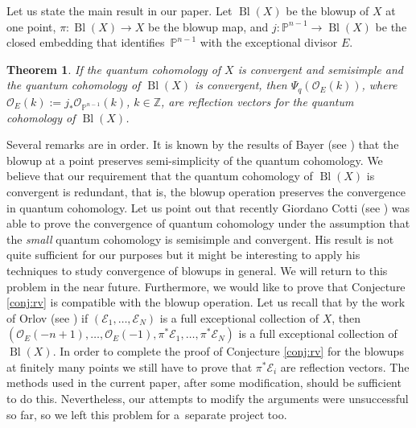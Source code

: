 \documentclass[pdftex]{sigma}
\numberwithin{equation}{section}
\newtheorem{Theorem}{Theorem}[section]
\newcommand{\ZZ}{\mathbb{Z}}
\newcommand{\PP}{\mathbb{P}}
\renewcommand{\O}{\mathcal{O}}
\newcommand{\E}{\mathcal{E}}
\begin{document}
Let us state the main result in our paper. Let $\operatorname{Bl}(X)$
be the blowup of $X$ at one point, $\pi\colon \operatorname{Bl}(X)\to X$ be
the blowup map, and $j\colon \PP^{n-1}\to \operatorname{Bl}(X)$ be the
closed embedding that identifies~$\PP^{n-1}$ with the exceptional
divisor $E$.
\begin{Theorem}\label{thm}
 If the quantum cohomology of $X$ is convergent and semisimple and
 the quantum cohomology of $\operatorname{Bl}(X)$ is convergent, then
 $\Psi_q(\O_E(k))$, where $\O_E(k):= j_* \O_{\PP^{n-1}}(k)$, $k\in \ZZ$, are
 reflection vectors for the quantum cohomology of
 $\operatorname{Bl}(X)$.
\end{Theorem}
Several remarks are in order. It is known by the results of Bayer (see
\cite{Ba}) that the blowup at a point preserves semi-simplicity of the
quantum cohomology. We believe that our requirement that the quantum
cohomology of $\operatorname{Bl}(X)$ is convergent is redundant, that
is, the blowup operation preserves the convergence in quantum
cohomology. Let us point out that recently Giordano Cotti (see
\cite[Theorem 6.6]{Cotti2021})
was able to prove the convergence of quantum cohomology under the
assumption that the {\em small} quantum cohomology is semisimple and
convergent. His result is not quite sufficient for our purposes but
it might be interesting to apply his techniques to study convergence
of blowups in general. We will return to this problem in the near future.
Furthermore, we would like to prove
that Conjecture \ref{conj:rv} is compatible with the blowup
operation. Let us recall that by the work of Orlov (see \cite{Orlov}) if
$(\E_1,\dots,\E_N)$ is a full exceptional collection of $X$, then
$(\O_E(-n+1), \dots, \O_E(-1), \pi^*\E_1,\dots,\pi^*\E_N)$ is a full
exceptional collection of $\operatorname{Bl}(X)$. In order to complete
the proof of Conjecture \ref{conj:rv} for the blowups at finitely many
points we still have to prove that $\pi^*\E_i$ are reflection
vectors. The methods used in the current paper, after some modification,
should be sufficient to do this. Nevertheless, our attempts to modify
the arguments were unsuccessful so far, so we left this problem for a~separate project too.
\end{document}
